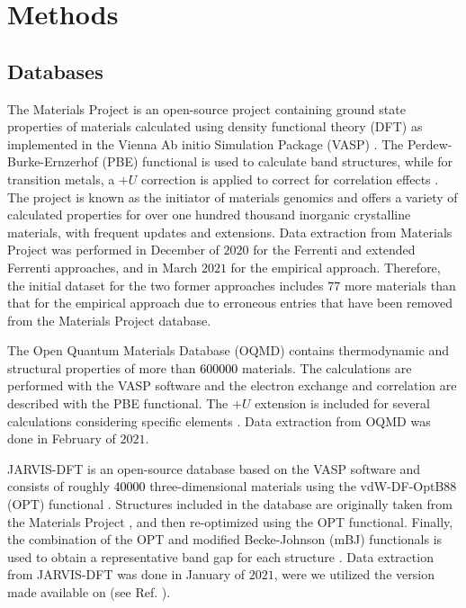 \documentclass[superscriptaddress,unsortedaddress,
 amsmath,amssymb,
 aps,
]{revtex4-2}
\newcommand{\mrk}[1]{\textcolor{black}{#1}}
\begin{document}
\section*{Methods}

\subsection*{Databases}
The Materials Project \cite{Jain2013, Jain2018} is an open-source project containing ground state properties of materials calculated using density functional theory (DFT) as implemented in the Vienna Ab initio Simulation Package (VASP) \cite{Kresse1996}. The Perdew-Burke-Ernzerhof \cite{Perdew1996} (PBE) functional is used to calculate band structures, while for transition metals, a $+U$ correction is applied to correct for correlation effects \cite{Wang2006}. The project is known as the initiator of materials genomics and offers a variety of calculated properties for over one hundred thousand inorganic crystalline materials, with frequent updates and extensions. Data extraction from Materials Project was performed in December of $2020$ for the Ferrenti and extended Ferrenti approaches, and in March $2021$ for the empirical approach. Therefore, the initial dataset for the two former approaches includes $77$ more materials than that for the empirical approach due to erroneous entries that have been removed from the Materials Project database.

The Open Quantum Materials Database (OQMD) \cite{Saal2013, Kirklin2015} contains thermodynamic and structural properties of more than \mrk{\num{600000}} materials. The calculations are performed with the VASP software and the electron exchange and correlation are described with the PBE functional. The $+U$ extension is included for several calculations considering specific elements \cite{Stevanovic2012}. Data extraction from OQMD was done in February of $2021$.

JARVIS-DFT \cite{Choudhary2020} is an open-source database based on the VASP software and consists of roughly \mrk{\num{40000}} three-dimensional materials using the vdW-DF-OptB88 (OPT) functional \cite{Thonhauser2007, Klimes2011}. Structures included in the database are originally taken from the Materials Project \cite{Jain2013, Jain2018}, and then re-optimized using the OPT functional. Finally, the combination of the OPT and modified Becke-Johnson (mBJ) functionals \cite{Tran2009} is used to obtain a representative band gap for each structure \cite{Choudhary2018a}. Data extraction from JARVIS-DFT was done in January of $2021$, were we utilized the version made available on \mrk{} (see Ref. \cite{Choudhary2020}).
\end{document}
